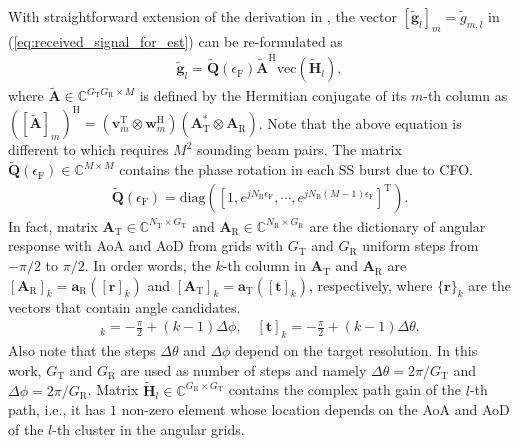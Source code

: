 \documentclass[journal]{IEEEtran}
\newcommand{\va}[1]{\mathbf{a}_{#1}}
\newcommand{\vA}[1]{\mathbf{A}_{#1}}
\newcommand{\tx}[0]{\text{T}}
\newcommand{\rx}[0]{\text{R}}
\newcommand{\hermitian}[0]{\text{H}}
\newcommand{\transpose}[0]{\text{T}}
\newcommand{\CFO}[0]{\epsilon_{\text{F}}}
\newcommand{\Gr}[0]{G_{\text{R}}}
\newcommand{\Gt}[0]{G_{\text{T}}}
\begin{document}
With straightforward extension of the derivation in \cite[Sec. V]{7400949}, the vector $[\tilde{\mathbf{g}}_l]_m = \tilde{g}_{m,l}$ in (\ref{eq:received_signal_for_est}) can be re-formulated as 
\begin{align}
\tilde{\mathbf{g}}_l = \tilde{\mathbf{Q}}(\CFO)\tilde{\mathbf{A}}^{\hermitian}\mathrm{vec}(\tilde{\mathbf{H}}_l),
\label{eq:CS_formulation}
\end{align}
where $\tilde{\mathbf{A}}\in \mathbb{C}^{G_{\tx}G_{\rx} \times M}$ is defined by the Hermitian conjugate of its $m$-th column as $([\tilde{\mathbf{A}}]_m)^{\hermitian}= (\mathbf{v}_m^{\transpose}\otimes \mathbf{w}_m^{\hermitian} )(\mathbf{A}^{*}_{\tx}\otimes\mathbf{A}_{\rx})$. Note that the above equation is different to \cite[Sec. V]{7400949} which requires $M^2$ sounding beam pairs. The matrix $\tilde{\mathbf{Q}}(\CFO)\in\mathbb{C}^{M\times M}$ contains the phase rotation in each SS burst due to CFO. 
\begin{align}
\tilde{\mathbf{Q}}(\CFO) = \mathrm{diag}\left(\left[1,e^{jN_{\text{B}}\CFO},\cdots,e^{jN_{\text{B}}(M-1)\CFO}\right]^{\transpose}\right).
\label{eq:Q_tilde_matrix}
\end{align}
In fact, matrix $\mathbf{A}_{\tx} \in \mathbb{C}^{N_{\tx} \times G_{\tx}}$ and $\mathbf{A}_{\rx}\in \mathbb{C}^{N_{\rx} \times G_{\rx}}$ are the dictionary of angular response with AoA and AoD from grids with $\Gt$ and $\Gr$ uniform steps from $-\pi/2$ to $\pi/2$. In order words, the $k$-th column in $\mathbf{A}_{\tx}$ and $\mathbf{A}_{\rx}$ are $[\vA{\rx}]_k = \va{\rx}([\mathbf{r}]_k)$ and $[\vA{\tx}]_k = \va{\tx}([\mathbf{t}]_k)$, respectively, where $\{\mathbf{r}\}_k$ are the vectors that contain angle candidates.
\begin{align}
[\mathbf{r}]_k = -\frac{\pi}{2}+(k-1)\Delta\phi, \quad [\mathbf{t}]_k = -\frac{\pi}{2}+(k-1)\Delta\theta.
\label{eq:angle_dictionary}
\end{align}
Also note that the steps $\Delta\theta$ and $\Delta\phi$ depend on the target resolution. In this work, $G_{\tx}$ and $G_{\rx}$ are used as number of steps and namely $\Delta\theta = 2\pi/G_{\tx}$ and $\Delta\phi = 2\pi/G_{\rx}$. 
Matrix $\tilde{\mathbf{H}}_l \in \mathbb{C}^{\Gr \times \Gt}$ contains the complex path gain of the $l$-th path, i.e., it has $1$ non-zero element whose location depends on the AoA and AoD of the $l$-th cluster in the angular grids.
\end{document}
